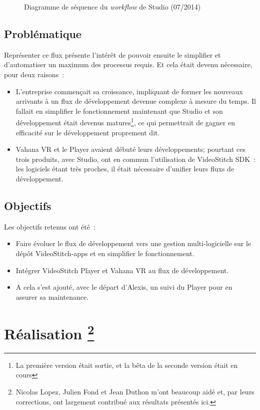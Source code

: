 \begin{figure}
  \centering
  \caption{Diagramme de séquence du \textit{workflow} de Studio (07/2014)}
	\label{workflow-studio}
\end{figure}

\subsection{Problématique}
Représenter ce flux présente l'intérêt de pouvoir ensuite le simplifier et d'automatiser
un maximum des processus requis. Et cela était devenu nécessaire, pour deux raisons~:
\begin{itemize}
  \item L'entreprise commençait sa croissance, impliquant de former les nouveaux arrivants
  à un flux de développement devenue complexe à mesure du temps. Il fallait en
  simplifier le fonctionnement maintenant que Studio et son développement était
  devenus matures\footnote{La première version était sortie, et la bêta de la seconde
  version était en cours}, ce qui permettrait de gagner en efficacité sur le développement
  proprement dit.
  \item Vahana VR et le Player avaient débuté leurs développements; pourtant ces trois
  produits, avec Studio, ont en commun l'utilisation de VideoStitch SDK~: les logiciels
  étant très proches, il était nécessaire d'unifier leurs fluxs de développement.
\end{itemize}

\subsection{Objectifs}
Les objectifs retenus ont été~:
\begin{itemize}
  \item Faire évoluer le flux de développement vers une gestion multi-logicielle sur le dépôt VideoStitch-apps 
  et en simplifier le fonctionnement.
  \item Intégrer VideoStitch Player et Vahana VR au flux de développement.
  \item A cela s'est ajouté, avec le départ d'Alexis, un suivi du Player pour en assurer
  sa maintenance.
\end{itemize}


\section[Réalisation]{Réalisation
\protect\footnote{Nicolas Lopez, Julien Fond et Jean Duthon m'ont beaucoup aidé et, par 
leurs corrections, ont largement contribué aux résultats présentés ici.}}

